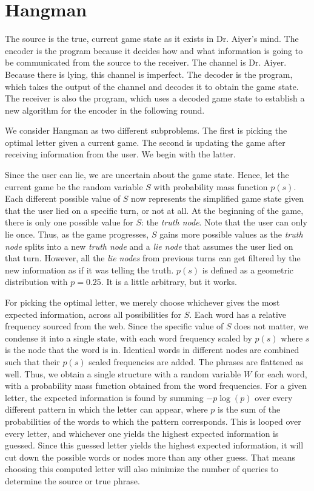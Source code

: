 \documentclass[conference,letterpaper]{IEEEtran}
\begin{document}
    \section{Hangman}

    The source is the true, current game state as it exists in Dr. Aiyer's mind.
    The encoder is the program because it decides how and what information is going to be communicated from the source to the receiver.
    The channel is Dr. Aiyer. Because there is lying, this channel is imperfect.
    The decoder is the program, which takes the output of the channel and decodes it to obtain the game state.
    The receiver is also the program, which uses a decoded game state to establish a new algorithm for the encoder in the following round.

    
    We consider Hangman as two different subproblems. The first is picking the optimal letter given a current game. The second is updating the game after receiving information from the user. We begin with the latter.
    
    Since the user can lie, we are uncertain about the game state. Hence, let the current game be the random variable $S$ with probability mass function $p(s)$. Each different possible value of $S$ now represents the simplified game state given that the user lied on a specific turn, or not at all. At the beginning of the game, there is only one possible value for $S$: the \textit{truth node}. Note that the user can only lie once. Thus, as the game progresses, $S$ gains more possible values as the \textit{truth node} splits into a new \textit{truth node} and a \textit{lie node} that assumes the user lied on that turn. However, all the \textit{lie nodes} from previous turns can get filtered by the new information as if it was telling the truth. $p(s)$ is defined as a geometric distribution with $p=0.25$. It is a little arbitrary, but it works.

    For picking the optimal letter, we merely choose whichever gives the most expected information, across all possibilities for $S$. Each word has a relative frequency sourced from the web. Since the specific value of $S$ does not matter, we condense it into a single state, with each word frequency scaled by $p(s)$ where $s$ is the node that the word is in. Identical words in different nodes are combined such that their $p(s)$ scaled frequencies are added. The phrases are flattened as well. Thus, we obtain a single structure with a random variable $W$ for each word, with a probability mass function obtained from the word frequencies. For a given letter, the expected information is found by summing $-p \log(p)$ over every different pattern in which the letter can appear, where $p$ is the sum of the probabilities of the words to which the pattern corresponds. This is looped over every letter, and whichever one yields the highest expected information is guessed. Since this guessed letter yields the highest expected information, it will cut down the possible words or nodes more than any other guess. That means choosing this computed letter will also minimize the number of queries to determine the source or true phrase.
    
\end{document}
